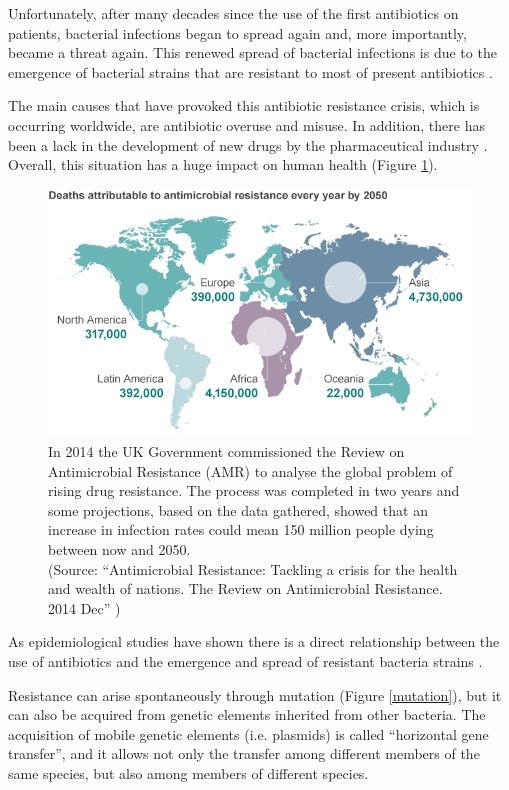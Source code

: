 \documentclass[11pt]{report}
\begin{document}
Unfortunately, after many decades since the use of the first antibiotics on patients, bacterial infections began to spread again and, more importantly, became a threat again.
This renewed spread of bacterial infections is due to the emergence of bacterial strains that are resistant to most of present antibiotics \cite{ventola2015antibiotic}.

The main causes that have provoked this antibiotic resistance crisis, which is occurring worldwide, are antibiotic overuse and misuse.
In addition, there has been a lack in the development of new drugs by the pharmaceutical industry \cite{nature2013}.
Overall, this situation has a huge impact on human health (Figure
\ref{antimicrobial2014}).

\begin{figure}[htp]
\centering
\includegraphics[scale=0.80]{img/antimicrobial2014.jpg}
\caption{In 2014 the UK Government commissioned the Review on Antimicrobial Resistance (AMR) to analyse the global problem of rising drug resistance.
The process was completed in two years and some projections, based on the data gathered, showed that an increase in infection rates could mean 150 million people dying between now and 2050.\\
(Source: ``Antimicrobial Resistance: Tackling a crisis for the health and wealth of nations. The Review on Antimicrobial Resistance. 2014 Dec'' \cite{antimicrobial2014})}
\label{antimicrobial2014}
\end{figure}

As epidemiological studies have shown there is a direct relationship between the use of antibiotics and the emergence and spread of resistant bacteria strains \cite{huttner2013antimicrobial}.

Resistance can arise spontaneously through mutation (Figure \ref{mutation}), but it can also be acquired from genetic elements inherited from other bacteria.
The acquisition of mobile genetic elements (i.e. plasmids) is called ``horizontal gene transfer'', and it allows not only the transfer among different members of the same species, but also among members of different species.
\end{document}
